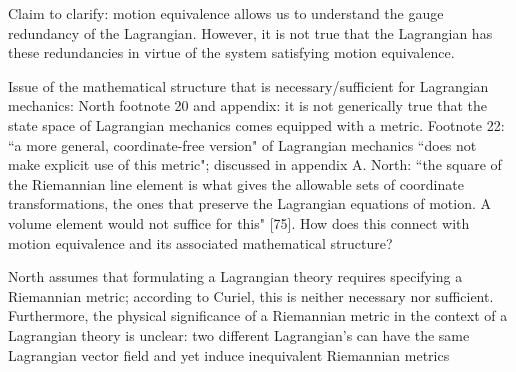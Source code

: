 \documentclass[letterpaper]{article}
\begin{document}
Claim to clarify: motion equivalence allows us to understand the gauge redundancy of the Lagrangian. However, it is not true that the Lagrangian has these redundancies in virtue of the system satisfying motion equivalence.

Issue of the mathematical structure that is necessary/sufficient for Lagrangian mechanics:
North footnote 20 and appendix: it is not generically true that the state space of Lagrangian mechanics comes equipped with a metric. Footnote 22: ``a more general, coordinate-free version" of Lagrangian mechanics ``does not make explicit use of this metric"; discussed in appendix A. North: ``the square of the Riemannian line element is what gives the allowable sets of coordinate transformations, the ones that preserve the Lagrangian equations of motion. A volume element would not suffice for this" [75]. How does this connect with motion equivalence and its associated mathematical structure?

North assumes that formulating a Lagrangian theory requires specifying a Riemannian metric; according to Curiel, this is neither necessary nor sufficient. Furthermore, the physical significance of a Riemannian metric in the context of a Lagrangian theory is unclear: two different Lagrangian's can have the same Lagrangian vector field and yet induce inequivalent Riemannian metrics










%

%
\printbibliography
\end{document}
